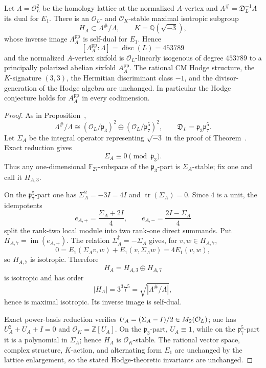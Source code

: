 \begin{proposition}\label{prop:Appisogenous}
Let $\Lambda=\mathcal O_L^2$ be the homology lattice at the normalized $A$-vertex and
$\Lambda^\#=\mathfrak D_L^{-1}\Lambda$ its dual for $E_1$.  There is an
$\mathcal O_L$- and $\mathcal O_K$-stable maximal isotropic subgroup
\[
 H_A\subset\Lambda^\#/\Lambda,\qquad K=\mathbb Q(\sqrt{-3}),
\]
whose inverse image $\Lambda_A^{\mathrm{pp}}$ is self-dual for $E_1$.  Hence
\[
 [\Lambda_A^{\mathrm{pp}}:\Lambda]=\operatorname{disc}(L)=453789
\]
and the normalized $A$-vertex sixfold is $\mathcal O_L$-linearly isogenous of degree
$453789$ to a principally polarized abelian sixfold $A_A^{\mathrm{pp}}$.
The rational CM Hodge structure, the $K$-signature $(3,3)$, the Hermitian
discriminant class $-1$, and the divisor-generation of the Hodge algebra are unchanged.
In particular the Hodge conjecture holds for $A_A^{\mathrm{pp}}$ in every codimension.
\end{proposition}
\begin{proof}
As in Proposition~,
\[
 \Lambda^\#/\Lambda\cong
 (\mathcal O_L/\mathfrak p_3)^2\oplus
 (\mathcal O_L/\mathfrak p_7^5)^2,
 \qquad
 \mathfrak D_L=\mathfrak p_3\mathfrak p_7^5.
\]
Let $\Sigma_A$ be the integral operator representing $\sqrt{-3}$ in the proof of
Theorem~.  Exact reduction gives
\[
 \Sigma_A\equiv0\pmod{\mathfrak p_3}.
\]
Thus any one-dimensional $\mathbb F_{27}$-subspace of the $\mathfrak p_3$-part is
$\Sigma_A$-stable; fix one and call it $H_{A,3}$.

On the $\mathfrak p_7^5$-part one has $\Sigma_A^2=-3I=4I$ and
$\operatorname{tr}(\Sigma_A)=0$.  Since $4$ is a unit, the idempotents
\[
 e_{A,+}=\frac{\Sigma_A+2I}{4},\qquad
 e_{A,-}=\frac{2I-\Sigma_A}{4}
\]
split the rank-two local module into two rank-one direct summands.  Put
$H_{A,7}=\operatorname{im}(e_{A,+})$.  The relation
$\Sigma_A^\dagger=-\Sigma_A$ gives, for $v,w\in H_{A,7}$,
\[
 0=E_1(\Sigma_Av,w)+E_1(v,\Sigma_Aw)=4E_1(v,w),
\]
so $H_{A,7}$ is isotropic.  Therefore
\[
 H_A=H_{A,3}\oplus H_{A,7}
\]
is isotropic and has order
\[
 |H_A|=3^3 7^5=\sqrt{|\Lambda^\#/\Lambda|},
\]
hence is maximal isotropic.  Its inverse image is self-dual.

Exact power-basis reduction verifies $U_A=(\Sigma_A-I)/2\in M_2(\mathcal O_L)$; one has $U_A^2+U_A+I=0$ and
$\mathcal O_K=\mathbb Z[U_A]$.  On the $\mathfrak p_3$-part,
$U_A\equiv1$, while on the $\mathfrak p_7^5$-part it is a polynomial in
$\Sigma_A$; hence $H_A$ is $\mathcal O_K$-stable.  The rational vector space,
complex structure, $K$-action, and alternating form $E_1$ are unchanged by the
lattice enlargement, so the stated Hodge-theoretic invariants are unchanged.
\end{proof}

